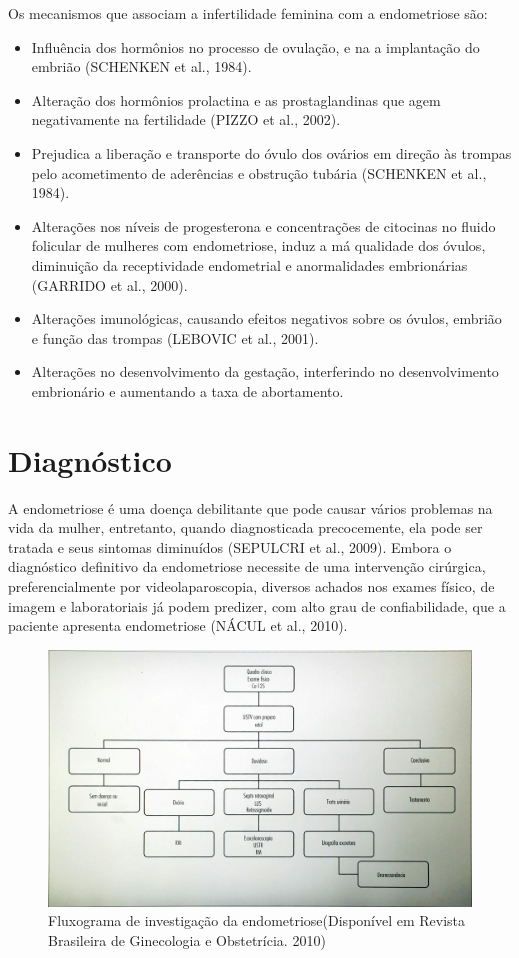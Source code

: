 \documentclass[12pt]{article} %
\begin{document}
Os mecanismos que associam a infertilidade feminina com a endometriose são:

\begin{itemize}
\item Influência dos hormônios no processo de ovulação, e na a implantação do embrião (SCHENKEN et al., 1984).
\item Alteração dos hormônios prolactina e as prostaglandinas que agem negativamente na fertilidade (PIZZO et al., 2002).
\item Prejudica a liberação e transporte do óvulo dos ovários em direção às trompas pelo acometimento de aderências e obstrução tubária (SCHENKEN et al., 1984).
\item Alterações nos níveis de progesterona e concentrações de citocinas no fluido folicular de mulheres com endometriose, induz a má qualidade dos óvulos, diminuição da receptividade endometrial e anormalidades embrionárias (GARRIDO et al., 2000).
\item Alterações imunológicas, causando efeitos negativos sobre os óvulos, embrião e função das trompas (LEBOVIC et al., 2001).
\item Alterações no desenvolvimento da gestação, interferindo no desenvolvimento embrionário e aumentando a taxa de abortamento.
\end{itemize}


\section{Diagnóstico}


A endometriose é uma doença debilitante que pode causar vários
problemas na vida da mulher, entretanto, quando diagnosticada
precocemente, ela pode ser tratada e seus sintomas diminuídos (SEPULCRI et al., 2009).  Embora
o diagnóstico definitivo da endometriose necessite de uma intervenção
cirúrgica, preferencialmente por videolaparoscopia, diversos achados
nos exames físico, de imagem e laboratoriais já podem predizer, com
alto grau de confiabilidade, que a paciente apresenta endometriose (NÁCUL et al., 2010).

\begin{figure}[h!]
\centering
\includegraphics[width=14cm]{tabela.png}
\caption[Fluxograma de investigação da endometriose]{Fluxograma de investigação da endometriose(Disponível em Revista Brasileira de Ginecologia e Obstetrícia. 2010)}
\end{figure}
\end{document}
